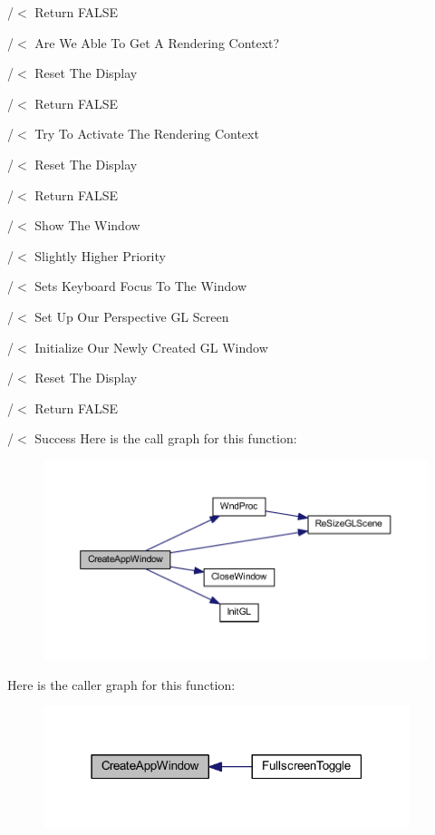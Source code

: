 /$<$ Return F\+A\+L\+SE

/$<$ Are We Able To Get A Rendering Context?

/$<$ Reset The Display

/$<$ Return F\+A\+L\+SE

/$<$ Try To Activate The Rendering Context

/$<$ Reset The Display

/$<$ Return F\+A\+L\+SE

/$<$ Show The Window

/$<$ Slightly Higher Priority

/$<$ Sets Keyboard Focus To The Window

/$<$ Set Up Our Perspective GL Screen

/$<$ Initialize Our Newly Created GL Window

/$<$ Reset The Display

/$<$ Return F\+A\+L\+SE

/$<$ Success Here is the call graph for this function\+:\nopagebreak
\begin{figure}[H]
\begin{center}
\leavevmode
\includegraphics[width=350pt]{supportcode_8cpp_acd4be192aca2369a87f51d952150a77b_cgraph}
\end{center}
\end{figure}
Here is the caller graph for this function\+:\nopagebreak
\begin{figure}[H]
\begin{center}
\leavevmode
\includegraphics[width=303pt]{supportcode_8cpp_acd4be192aca2369a87f51d952150a77b_icgraph}
\end{center}
\end{figure}
\mbox{\label{supportcode_8cpp_ac43c2dc16b0859b03a4f7d04a7e97d3c}} 
